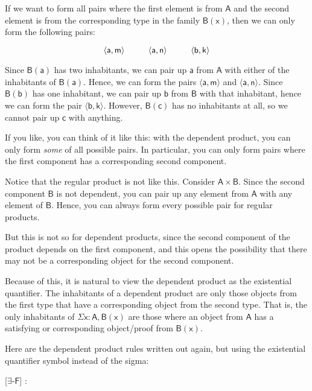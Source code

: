 \documentclass{article}
\newcommand\hypo{\Hypo}
\newcommand\infer{\Infer}
\newcommand\term{\mathsf}
\def\Type/{\term{Type}}
\def\Form/{\term{F}}
\def\SigmaBinder/{\Sigma}
\newcommand\depprod[3]{\term{\SigmaBinder/ #1 : #2, #3}}
\def\pairSymbol/{\times}
\newcommand\pair[2]{\term{\langle #1, #2 \rangle}}
\def\someBinder/{\exists}
\def\someF/{$\someBinder/$-$\Form/$}
\newcommand\some[3]{\term{\someBinder/ #1 : #2, #3}}
\begin{document}
If we want to form all pairs where the first element is from $\term{A}$ and the second element is from the corresponding type in the family $\term{B(x)}$, then we can only form the following pairs:

\begin{equation*}
  \pair{a}{m} \hskip 1cm \pair{a}{n} \hskip 1cm \pair{b}{k}
\end{equation*}

Since $\term{B(a)}$ has two inhabitants, we can pair up $\term{a}$ from $\term{A}$ with either of the inhabitants of $\term{B(a)}$. Hence, we can form the pairs $\pair{a}{m}$ and $\pair{a}{n}$. Since $\term{B(b)}$ has one inhabitant, we can pair up $\term{b}$ from $\term{B}$ with that inhabitant, hence we can form the pair $\pair{b}{k}$. However, $\term{B(c)}$ has no inhabitants at all, so we cannot pair up $\term{c}$ with anything.

If you like, you can think of it like this: with the dependent product, you can only form \emph{some} of all possible pairs. In particular, you can only form pairs where the first component has a corresponding second component.

Notice that the regular product is not like this. Consider $\term{A \pairSymbol/ B}$. Since the second component $\term{B}$ is not dependent, you can pair up any element from $\term{A}$ with any element of $\term{B}$. Hence, you can always form every possible pair for regular products.

But this is not so for dependent products, since the second component of the product depends on the first component, and this opens the possibility that there may not be a corresponding object for the second component. 

Because of this, it is natural to view the dependent product as the existential quantifier. The inhabitants of a dependent product are only those objects from the first type that have a corresponding object from the second type. That is, the only inhabitants of $\depprod{x}{A}{B(x)}$ are those where an object from $\term{A}$ has a satisfying or corresponding object/proof from $\term{B(x)}$.

Here are the dependent product rules written out again, but using the existential quantifier symbol instead of the sigma:

\begin{prooftree*}
  \hypo{\term{A} : \Type/}
  \hypo{\term{x} : \term{A}}
  \hypo{\term{B(x)} : \Type/}
  \infer3[\someF/]{\some{x}{A}{B(x)} : \Type/}
\end{prooftree*}
\end{document}

